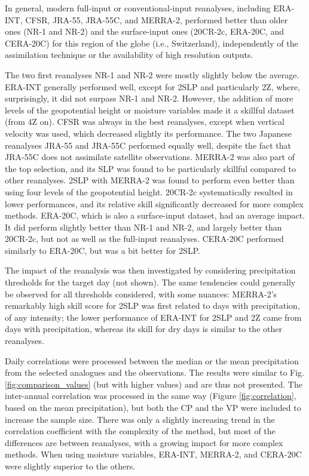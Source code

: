 \documentclass{ametsoc}
\begin{document}
	In general, modern full-input or conventional-input reanalyses, including ERA-INT, CFSR, JRA-55, JRA-55C, and MERRA-2, performed better than older ones (NR-1 and NR-2) and the surface-input ones (20CR-2c, ERA-20C, and CERA-20C) for this region of the globe (i.e., Switzerland), independently of the assimilation technique or the availability of high resolution outputs.
	
	The two first reanalyses NR-1 and NR-2 were mostly slightly below the average. ERA-INT generally performed well, except for 2SLP and particularly 2Z, where, surprisingly, it did not surpass NR-1 and NR-2. However, the addition of more levels of the geopotential height or moisture variables made it a skillful dataset (from 4Z on). CFSR was always in the best reanalyses, except when vertical velocity was used, which decreased slightly its performance. The two Japanese reanalyses JRA-55 and JRA-55C performed equally well, despite the fact that JRA-55C does not assimilate satellite observations. MERRA-2 was also part of the top selection, and its SLP was found to be particularly skillful compared to other reanalyses. 2SLP with MERRA-2 was found to perform even better than using four levels of the geopotential height. 20CR-2c systematically resulted in lower performances, and its relative skill significantly decreased for more complex methods. ERA-20C, which is also a surface-input dataset, had an average impact. It did perform slightly better than NR-1 and NR-2, and largely better than 20CR-2c, but not as well as the full-input reanalyses. CERA-20C performed similarly to ERA-20C, but was a bit better for 2SLP.
	
	The impact of the reanalysis was then investigated by considering precipitation thresholds for the target day (not shown). The same tendencies could generally be observed for all thresholds considered, with some nuances: MERRA-2's remarkably high skill score for 2SLP was first related to days with precipitation, of any intensity; the lower performance of ERA-INT for 2SLP and 2Z came from days with precipitation, whereas its skill for dry days is similar to the other reanalyses.
	
	Daily correlations were processed between the median or the mean precipitation from the selected analogues and the observations. The results were similar to Fig. \ref{fig:comparison_values} (but with higher values) and are thus not presented. The inter-annual correlation was processed in the same way (Figure \ref{fig:correlation}, based on the mean precipitation), but both the CP and the VP were included to increase the sample size. There was only a slightly increasing trend in the correlation coefficient with the complexity of the method, but most of the differences are between reanalyses, with a growing impact for more complex methods. When using moisture variables, ERA-INT, MERRA-2, and CERA-20C were slightly superior to the others.
	
\end{document}
